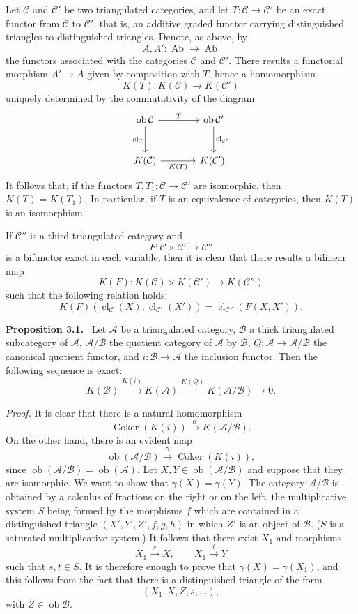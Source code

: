 \documentclass[11pt]{article}
\newenvironment{statement}[1]{\par\medskip\noindent\textbf{#1.}\ }{\par\medskip}
\providecommand{\Ob}{\operatorname{ob}}
\providecommand{\cC}{\mathcal C}
\providecommand{\Ob}{\operatorname{ob}}
\providecommand{\Ab}{\operatorname{Ab}}
\providecommand{\cC}{\mathcal C}
\providecommand{\cA}{\mathcal A}
\providecommand{\cB}{\mathcal B}
\providecommand{\Ab}{\operatorname{Ab}}
\providecommand{\Ob}{\operatorname{Ob}}
\begin{document}
Let $\cC$ and $\cC'$ be two triangulated categories, and let $T:\cC\to\cC'$ be an exact functor from $\cC$ to $\cC'$, that is, an additive graded functor carrying distinguished triangles to distinguished triangles. Denote, as above, by
\[
A,A':\Ab\longrightarrow\Ab
\]
the functors associated with the categories $\cC$ and $\cC'$. There results a functorial morphism $A'\to A$ given by composition with $T$, hence a homomorphism
\[
K(T):K(\cC)\longrightarrow K(\cC')
\]
uniquely determined by the commutativity of the diagram
\[
\begin{tikzcd}[column sep=large,row sep=large]
\Ob\cC \arrow[r,"T"] \arrow[d,"\operatorname{cl}_{\cC}"']&
\Ob\cC' \arrow[d,"\operatorname{cl}_{\cC'}"]\\
K(\cC) \arrow[r,"K(T)"']& K(\cC').
\end{tikzcd}
\]
It follows that, if the functors $T,T_1:\cC\to\cC'$ are isomorphic, then $K(T)=K(T_1)$. In particular, if $T$ is an equivalence of categories, then $K(T)$ is an isomorphism.

If $\cC''$ is a third triangulated category and
\[
F:\cC\times\cC'\longrightarrow \cC''
\]
is a bifunctor exact in each variable, then it is clear that there results a bilinear map
\[
K(F):K(\cC)\times K(\cC')\longrightarrow K(\cC'')
\]
such that the following relation holds:
\[
K(F)(\operatorname{cl}_{\cC}(X),\operatorname{cl}_{\cC'}(X'))
=
\operatorname{cl}_{\cC''}(F(X,X')).
\]

\begin{statement}{Proposition 3.1}
Let $\cA$ be a triangulated category, $\cB$ a thick triangulated subcategory of $\cA$, $\cA/\cB$ the quotient category of $\cA$ by $\cB$, $Q:\cA\to\cA/\cB$ the canonical quotient functor, and $i:\cB\to\cA$ the inclusion functor. Then the following sequence is exact:
\[
K(\cB)\xrightarrow{K(i)}K(\cA)\xrightarrow{K(Q)}K(\cA/\cB)\longrightarrow 0.
\]
\end{statement}

\emph{Proof.} It is clear that there is a natural homomorphism
\[
\operatorname{Coker}(K(i))\xrightarrow{\alpha}K(\cA/\cB).
\]
On the other hand, there is an evident map
\[
\Ob(\cA/\cB)\xrightarrow{\gamma}\operatorname{Coker}(K(i)),
\]
since $\Ob(\cA/\cB)=\Ob(\cA)$. Let $X,Y\in\Ob(\cA/\cB)$ and suppose that they are isomorphic. We want to show that $\gamma(X)=\gamma(Y)$. The category $\cA/\cB$ is obtained by a calculus of fractions on the right or on the left, the multiplicative system $S$ being formed by the morphisms $f$ which are contained in a distinguished triangle $(X',Y',Z',f,g,h)$ in which $Z'$ is an object of $\cB$. ($S$ is a saturated multiplicative system.) It follows that there exist $X_1$ and morphisms
\[
X_1\xrightarrow{s}X,\qquad X_1\xrightarrow{t}Y
\]
such that $s,t\in S$. It is therefore enough to prove that $\gamma(X)=\gamma(X_1)$, and this follows from the fact that there is a distinguished triangle of the form
\[
(X_1,X,Z,s,\ldots),
\]
with $Z\in\Ob\cB$.
\end{document}
